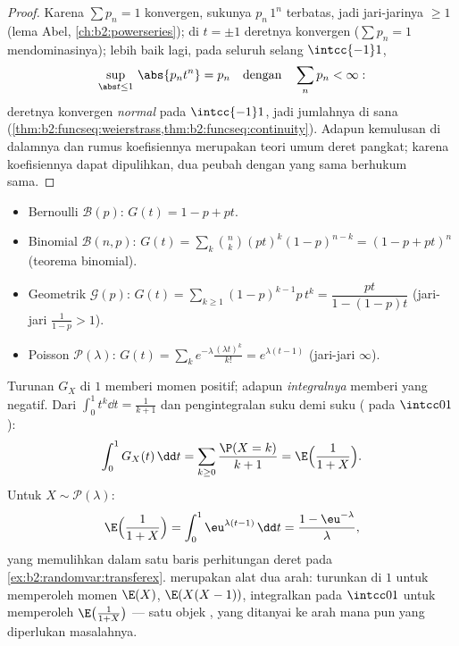 \begin{proof}
Karena $\sum p_n = 1$ konvergen, sukunya $p_n\,1^n$ terbatas,
jadi jari-jarinya $\geq 1$ (lema Abel,
\cref{ch:b2:powerseries}); di $t = \pm1$ deretnya konvergen
 ($\sum p_n = 1$ mendominasinya); lebih baik lagi, pada seluruh
selang $\intcc{-1}1$,
\[
\sup_{\abs t\leq1}\,\abs{p_nt^n} = p_n
\quad\text{dengan}\quad \sum_np_n < \infty :
\]
deretnya konvergen \emph{normal} pada $\intcc{-1}1$, jadi
jumlahnya  di sana
(\cref{thm:b2:funcseq:weierstrass,thm:b2:funcseq:continuity}). Adapun kemulusan di dalamnya dan rumus
koefisiennya merupakan teori umum deret pangkat; karena koefisiennya
dapat dipulihkan, dua peubah dengan  yang sama
berhukum sama.
\end{proof}

\begin{example}\label{ex:b2:genfun:classical}
\leavevmode
\begin{itemize}
\item Bernoulli $\mathcal{B}(p)$: $G(t) = 1 - p + pt$.
\item Binomial $\mathcal{B}(n, p)$: $G(t) = \sum_k \binom nk
(pt)^k(1-p)^{n-k} = (1 - p + pt)^n$ (teorema binomial).
\item Geometrik $\mathcal{G}(p)$: $G(t) =
\sum_{k\geq1}(1-p)^{k-1}p\,t^k = \dfrac{pt}{1 - (1-p)t}$ (jari-jari
$\frac{1}{1-p} > 1$).
\item Poisson $\mathcal{P}(\lambda)$: $G(t) =
\sum_k e^{-\lambda}\frac{(\lambda t)^k}{k!} = e^{\lambda(t - 1)}$
(jari-jari $\infty$).
\end{itemize}
\end{example}

\begin{example}\label{ex:b2:genfun:integraltrick}
Turunan $G_X$ di $1$ memberi momen positif; adapun
\emph{integralnya} memberi yang negatif. Dari $\int_0^1t^k\dd t
= \frac1{k+1}$ dan pengintegralan suku demi suku ( pada $\intcc01$):
\[
\int_0^1G_X(t)\,\dd t = \sum_{k\geq0}\frac{\P(X =
k)}{k+1} = \E\Bigl(\frac1{1+X}\Bigr).
\]
Untuk $X \sim \mathcal P(\lambda)$:
\[
\E\Bigl(\frac1{1+X}\Bigr) =
\int_0^1\eu^{\lambda(t-1)}\,\dd t = \frac{1 -
\eu^{-\lambda}}{\lambda},
\]
yang memulihkan dalam satu baris perhitungan deret pada
\cref{ex:b2:randomvar:transferex}. 
merupakan alat dua arah: turunkan di $1$ untuk memperoleh
momen $\E(X)$, $\E(X(X-1))$, integralkan pada $\intcc01$
untuk memperoleh $\E\bigl(\frac1{1+X}\bigr)$ --- satu objek ,
yang ditanyai ke arah mana pun yang diperlukan masalahnya.
\end{example}

